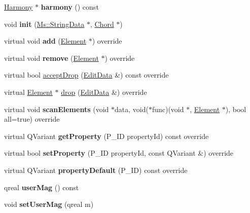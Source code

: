 \begin{DoxyCompactItemize}
\mbox{\label{class_ms_1_1_fret_diagram_a0a4ebc84b5b1c6295af8ea97a3cac02e}} 
\hyperlink{class_ms_1_1_harmony}{Harmony} $\ast$ {\bfseries harmony} () const
\item 
\mbox{\label{class_ms_1_1_fret_diagram_aa5dd876f999a4735cd50aa6a61af082d}} 
void {\bfseries init} (\hyperlink{class_ms_1_1_string_data}{Ms\+::\+String\+Data} $\ast$, \hyperlink{class_ms_1_1_chord}{Chord} $\ast$)
\item 
\mbox{\label{class_ms_1_1_fret_diagram_abd8f989c2d8852508c378f3dd2121d9e}} 
virtual void {\bfseries add} (\hyperlink{class_ms_1_1_element}{Element} $\ast$) override
\item 
\mbox{\label{class_ms_1_1_fret_diagram_af6dd374f6657554109adb46c8c4d1f64}} 
virtual void {\bfseries remove} (\hyperlink{class_ms_1_1_element}{Element} $\ast$) override
\item 
virtual bool \hyperlink{class_ms_1_1_fret_diagram_ab864841b949f7e5e5f16d93606b40896}{accept\+Drop} (\hyperlink{class_ms_1_1_edit_data}{Edit\+Data} \&) const override
\item 
virtual \hyperlink{class_ms_1_1_element}{Element} $\ast$ \hyperlink{class_ms_1_1_fret_diagram_ae054df6c63b099396073d3f4c6604262}{drop} (\hyperlink{class_ms_1_1_edit_data}{Edit\+Data} \&) override
\item 
\mbox{\label{class_ms_1_1_fret_diagram_a365b972977d4824efe3ba36a9ff5e770}} 
virtual void {\bfseries scan\+Elements} (void $\ast$data, void($\ast$func)(void $\ast$, \hyperlink{class_ms_1_1_element}{Element} $\ast$), bool all=true) override
\item 
\mbox{\label{class_ms_1_1_fret_diagram_abc9e83bace5f1347172d4b0d2bb8f781}} 
virtual Q\+Variant {\bfseries get\+Property} (P\+\_\+\+ID property\+Id) const override
\item 
\mbox{\label{class_ms_1_1_fret_diagram_a7956ca0844e9f34d31a37dcda83d2b19}} 
virtual bool {\bfseries set\+Property} (P\+\_\+\+ID property\+Id, const Q\+Variant \&) override
\item 
\mbox{\label{class_ms_1_1_fret_diagram_a896f44e1f1f97dc5a5dd50a80d8f242b}} 
virtual Q\+Variant {\bfseries property\+Default} (P\+\_\+\+ID) const override
\item 
\mbox{\label{class_ms_1_1_fret_diagram_a3b013f3e31411387a47e6199c744e5cf}} 
qreal {\bfseries user\+Mag} () const
\item 
\mbox{\label{class_ms_1_1_fret_diagram_a7906e1caa1c792bc274a58446985224c}} 
void {\bfseries set\+User\+Mag} (qreal m)
\end{DoxyCompactItemize}
